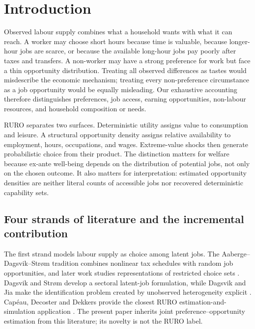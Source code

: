 \documentclass[11pt,a4paper]{article}
\begin{document}
\section{Introduction}

Observed labour supply combines what a household wants with what it can reach.
A worker may choose short hours because time is valuable, because longer-hour
jobs are scarce, or because the available long-hour jobs pay poorly after taxes
and transfers. A non-worker may have a strong preference for work but face a
thin opportunity distribution. Treating all observed differences as tastes
would misdescribe the economic mechanism; treating every non-preference
circumstance as a job opportunity would be equally misleading. Our exhaustive
accounting therefore distinguishes preferences, job access, earning
opportunities, non-labour resources, and household composition or needs.

RURO separates two surfaces. Deterministic utility assigns value to
consumption and leisure. A structural opportunity density assigns relative
availability to employment, hours, occupations, and wages. Extreme-value shocks
then generate probabilistic choice from their product. The distinction matters
for welfare because ex-ante well-being depends on the distribution of potential
jobs, not only on the chosen outcome. It also matters for interpretation:
estimated opportunity densities are neither literal counts of accessible jobs
nor recovered deterministic capability sets.

\subsection{Four strands of literature and the incremental contribution}

The first strand models labour supply as choice among latent jobs. The
Aaberge--Dagsvik--Str\o m tradition combines nonlinear tax schedules with random
job opportunities, and later work studies representations of restricted choice
sets \citep{aaberge1995,aaberge1999,aaberge2009}. Dagsvik and Str\o m develop a
sectoral latent-job formulation, while Dagsvik and Jia make the identification
problem created by unobserved heterogeneity explicit
\citep{dagsvikstrom2006,dagsviketal2014,dagsvikjia2016}. Cap\'eau, Decoster and
Dekkers provide the closest RURO estimation-and-simulation application
\citep{capeau2016}. The present paper inherits joint preference--opportunity
estimation from this literature; its novelty is not the RURO label.
\end{document}
